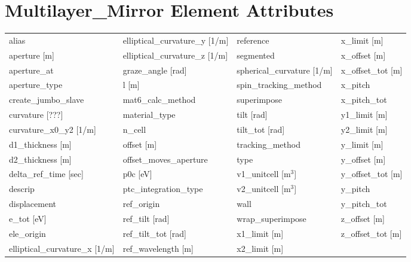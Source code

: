  \section{Multilayer_Mirror Element Attributes}
 \label{s:list.multilayer.mirror}
 
 \begin{tabular}{llll} \toprule
alias                            & elliptical_curvature_y [1/m]     & reference                        & x_limit [m]                      \\
aperture [m]                     & elliptical_curvature_z [1/m]     & segmented                        & x_offset [m]                     \\
aperture_at                      & graze_angle [rad]                & spherical_curvature [1/m]        & x_offset_tot [m]                 \\
aperture_type                    & l [m]                            & spin_tracking_method             & x_pitch                          \\
create_jumbo_slave               & mat6_calc_method                 & superimpose                      & x_pitch_tot                      \\
curvature [???]                  & material_type                    & tilt [rad]                       & y1_limit [m]                     \\
curvature_x0_y2 [1/m]            & n_cell                           & tilt_tot [rad]                   & y2_limit [m]                     \\
d1_thickness [m]                 & offset [m]                       & tracking_method                  & y_limit [m]                      \\
d2_thickness [m]                 & offset_moves_aperture            & type                             & y_offset [m]                     \\
delta_ref_time [sec]             & p0c [eV]                         & v1_unitcell [m$^3$]              & y_offset_tot [m]                 \\
descrip                          & ptc_integration_type             & v2_unitcell [m$^3$]              & y_pitch                          \\
displacement                     & ref_origin                       & wall                             & y_pitch_tot                      \\
e_tot [eV]                       & ref_tilt [rad]                   & wrap_superimpose                 & z_offset [m]                     \\
ele_origin                       & ref_tilt_tot [rad]               & x1_limit [m]                     & z_offset_tot [m]                 \\
elliptical_curvature_x [1/m]     & ref_wavelength [m]               & x2_limit [m]                     &                                  \\
 \bottomrule
 \end{tabular}
 \vfill
 
